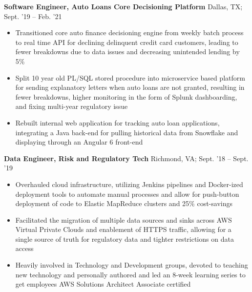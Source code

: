 \documentclass[11pt]{article}
\begin{document}
\textbf{Software Engineer, Auto Loans Core Decisioning Platform} \hfill Dallas, TX; Sept. '19 -- Feb. '21
\begin{itemize}
  \item Transitioned core auto finance decisioning engine from weekly batch
        process to real time API for declining delinquent credit card customers,
        leading to fewer breakdowns due to data issues and decreasing unintended
        lending by 5\%
  \item Split 10 year old PL/SQL stored procedure into microservice based
        platform for sending explanatory letters when auto loans are not granted,
        resulting in fewer breakdowns, higher monitoring in the form of Splunk dashboarding,
        and fixing multi-year regulatory issue
  \item Rebuilt internal web application for tracking auto loan applications,
        integrating a Java back-end for pulling historical data from Snowflake
        and displaying through an Angular 6 front-end
\end{itemize}

\textbf{Data Engineer, Risk and Regulatory Tech} \hfill Richmond, VA; Sept. '18 -- Sept. '19
\begin{itemize}
  \item Overhauled cloud infrastructure, utilizing Jenkins pipelines and
        Docker-ized deployment tools to automate manual processes and allow for
        push-button deployment of code to Elastic MapReduce clusters and 25\% cost-savings
  \item Facilitated the migration of multiple data sources and sinks across AWS Virtual
        Private Clouds and enablement of HTTPS traffic, allowing for a single source
        of truth for regulatory data and tighter restrictions on data access
  \item Heavily involved in Technology and Development groups, devoted to teaching
        new technology and personally authored and led an 8-week learning series
        to get employees AWS Solutions Architect Associate certified
\end{itemize}

\end{document}
